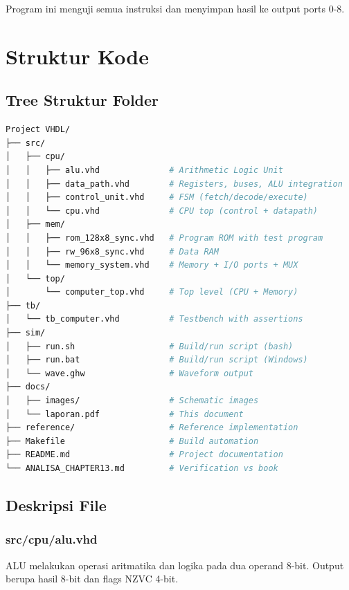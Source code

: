 \documentclass[12pt,a4paper]{report}
\begin{document}
Program ini menguji semua instruksi dan menyimpan hasil ke output ports 0-8.

\chapter{Struktur Kode}

\section{Tree Struktur Folder}

\begin{lstlisting}[language=bash]
Project VHDL/
├── src/
│   ├── cpu/
│   │   ├── alu.vhd              # Arithmetic Logic Unit
│   │   ├── data_path.vhd        # Registers, buses, ALU integration
│   │   ├── control_unit.vhd     # FSM (fetch/decode/execute)
│   │   └── cpu.vhd              # CPU top (control + datapath)
│   ├── mem/
│   │   ├── rom_128x8_sync.vhd   # Program ROM with test program
│   │   ├── rw_96x8_sync.vhd     # Data RAM
│   │   └── memory_system.vhd    # Memory + I/O ports + MUX
│   └── top/
│       └── computer_top.vhd     # Top level (CPU + Memory)
├── tb/
│   └── tb_computer.vhd          # Testbench with assertions
├── sim/
│   ├── run.sh                   # Build/run script (bash)
│   ├── run.bat                  # Build/run script (Windows)
│   └── wave.ghw                 # Waveform output
├── docs/
│   ├── images/                  # Schematic images
│   └── laporan.pdf              # This document
├── reference/                   # Reference implementation
├── Makefile                     # Build automation
├── README.md                    # Project documentation
└── ANALISA_CHAPTER13.md         # Verification vs book
\end{lstlisting}

\section{Deskripsi File}

\subsection{src/cpu/alu.vhd}

ALU melakukan operasi aritmatika dan logika pada dua operand 8-bit. Output berupa hasil 8-bit dan flags NZVC 4-bit.
\end{document}
